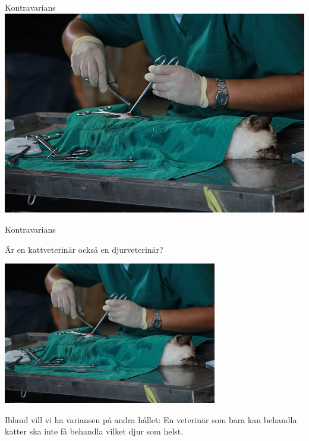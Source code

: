 \ifkompendium\else
\begin{SlideSimple}{Kontravarians}
\hspace*{-1cm}\includegraphics[width=1.2\textwidth]{../img/cat-vet.jpg}  
\end{SlideSimple}
\fi 

\begin{Slide}{Kontravarians}
\begin{center}
Är en kattveterinär också en djurveterinär?

\includegraphics[width=0.70\textwidth]{../img/cat-vet.jpg}  

Ibland vill vi ha variansen på andra hållet: En veterinär som bara kan behandla katter ska inte få behandla vilket djur som helst.
\end{center}
\end{Slide}

